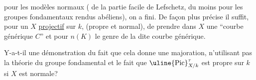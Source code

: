 pour les modèles normaux ( de
la partie facile de Lefschetz, du moins pour
les groupes fondamentaux rendus abéliens),
on a fini. De façon plus précise
il suffit, pour un  $X$ \uline{projectif} sur $k$,
(propre et normal), de prendre dans $X$
une ``courbe générique $C$'' et pour
$n(K)$ le genre de la dite courbe
générique.


Y-a-t-il une démonstration du fait
que cela donne une majoration, n'utilisant
pas la théorie du groupe fondamental
et le fait que $\uline{\mathrm{Pic}}^\tau_{X/k}$ est propre sur $k$
si $X$ est normale?
